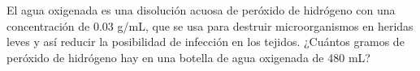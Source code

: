 \question[15] El agua oxigenada es una disolución acuosa de peróxido de hidrógeno con una concentración de 0.03 g/mL, 
que se usa para destruir microorganismos en heridas leves y así reducir la posibilidad de infección en los tejidos.
 ¿Cuántos gramos de peróxido de hidrógeno hay en una botella de agua oxigenada de 480 mL?

 \begin{solutionbox}{5cm}
    
 \end{solutionbox}